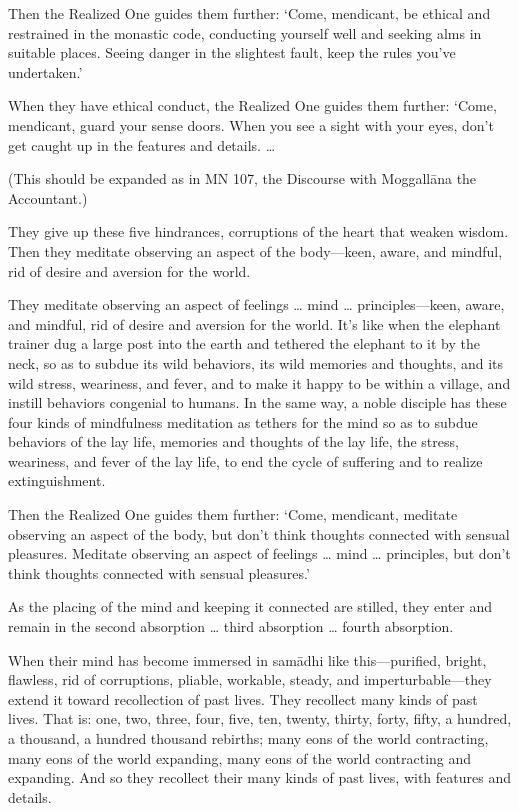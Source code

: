 \documentclass[12pt,openany]{book}%
\begin{document}
Then the Realized One guides them further: ‘Come, mendicant, be ethical and restrained in the monastic code, conducting yourself well and seeking alms in suitable places. Seeing danger in the slightest fault, keep the rules you’ve undertaken.’ 

When they have ethical conduct, the Realized One guides them further: ‘Come, mendicant, guard your sense doors. When you see a sight with your eyes, don’t get caught up in the features and details. … 

(This should be expanded as in MN 107, the Discourse with \textsanskrit{Moggallāna} the Accountant.) 

They give up these five hindrances, corruptions of the heart that weaken wisdom. Then they meditate observing an aspect of the body—keen, aware, and mindful, rid of desire and aversion for the world. 

They meditate observing an aspect of feelings … mind … principles—keen, aware, and mindful, rid of desire and aversion for the world. It’s like when the elephant trainer dug a large post into the earth and tethered the elephant to it by the neck, so as to subdue its wild behaviors, its wild memories and thoughts, and its wild stress, weariness, and fever, and to make it happy to be within a village, and instill behaviors congenial to humans. In the same way, a noble disciple has these four kinds of mindfulness meditation as tethers for the mind so as to subdue behaviors of the lay life, memories and thoughts of the lay life, the stress, weariness, and fever of the lay life, to end the cycle of suffering and to realize extinguishment. 

Then the Realized One guides them further: ‘Come, mendicant, meditate observing an aspect of the body, but don’t think thoughts connected with sensual pleasures. Meditate observing an aspect of feelings … mind … principles, but don’t think thoughts connected with sensual pleasures.’ 

As the placing of the mind and keeping it connected are stilled, they enter and remain in the second absorption … third absorption … fourth absorption. 

When their mind has become immersed in \textsanskrit{samādhi} like this—purified, bright, flawless, rid of corruptions, pliable, workable, steady, and imperturbable—they extend it toward recollection of past lives. They recollect many kinds of past lives. That is: one, two, three, four, five, ten, twenty, thirty, forty, fifty, a hundred, a thousand, a hundred thousand rebirths; many eons of the world contracting, many eons of the world expanding, many eons of the world contracting and expanding. And so they recollect their many kinds of past lives, with features and details. 
\end{document}
